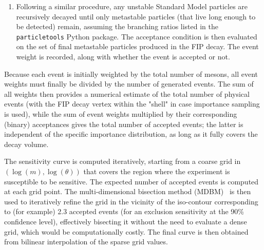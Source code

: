 \documentclass[
    aps,prd,
    twocolumn,
    nofootinbib,
    superscriptaddress,
]{revtex4}
\begin{document}
\begin{enumerate}
\item Following a similar procedure, any unstable Standard Model particles are recursively decayed until only metastable particles (that live long enough to be detected) remain, assuming the branching ratios listed in the \texttt{particletools} Python package. The acceptance condition is then evaluated on the set of final metastable particles produced in the FIP decay. The event weight is recorded, along with whether the event is accepted or not.
\end{enumerate}

Because each event is initially weighted by the total number of mesons, all event weights must finally be divided by the number of generated events. The sum of all weights then provides a numerical estimate of the total number of physical events (with the FIP decay vertex within the "shell" in case importance sampling is used), while the sum of event weights multiplied by their corresponding (binary) acceptances gives the total number of accepted events; the latter is independent of the specific importance distribution, as long as it fully covers the decay volume.

The sensitivity curve is computed iteratively, starting from a coarse grid in $(\log(m),\allowbreak \log(\theta))$ that covers the region where the experiment is susceptible to be sensitive. The expected number of accepted events is computed at each grid point. The multi-dimensional bisection method (MDBM)~\cite{MDBM} is then used to iteratively refine the grid in the vicinity of the iso-contour corresponding to (for example) 2.3 accepted events (for an exclusion sensitivity at the 90\% confidence level), effectively bisecting it without the need to evaluate a dense grid, which would be computationally costly. The final curve is then obtained from bilinear interpolation of the sparse grid values.

\newpage

%
%


\end{document}
